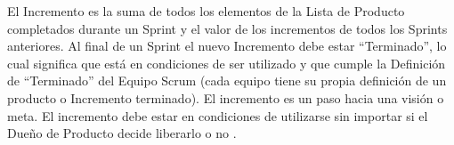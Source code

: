 El Incremento es la suma de todos los elementos de la Lista de Producto completados durante un Sprint y el valor de los incrementos de todos los Sprints anteriores. Al final de un Sprint el nuevo Incremento debe estar “Terminado”, lo cual significa que está en condiciones de ser utilizado y que cumple la Definición de “Terminado” del Equipo Scrum (cada equipo tiene su propia definición de un producto o Incremento terminado). El incremento es un paso hacia una visión o meta. El incremento debe estar en condiciones de utilizarse sin importar si el Dueño de Producto decide liberarlo o no \cite{scrumSchwaber}.


